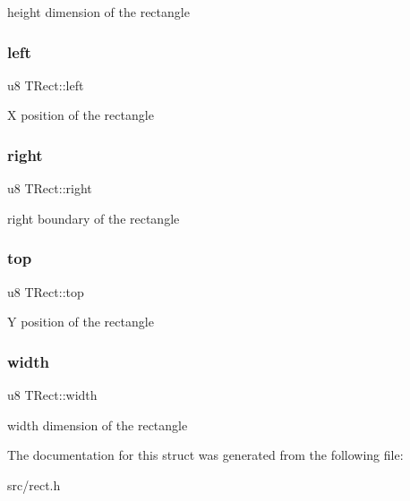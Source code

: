 height dimension of the rectangle \mbox{\label{structTRect_abf4bc428ae2b560efda3c60687a73f00}} 
\subsubsection{\texorpdfstring{left}{left}}
{\footnotesize\ttfamily u8 T\+Rect\+::left}

X position of the rectangle \mbox{\label{structTRect_ae2a5778c81eb1e464703e1a563e7dcf0}} 
\subsubsection{\texorpdfstring{right}{right}}
{\footnotesize\ttfamily u8 T\+Rect\+::right}

right boundary of the rectangle \mbox{\label{structTRect_a145b5ca0d242dc39c33f1fa72dd04056}} 
\subsubsection{\texorpdfstring{top}{top}}
{\footnotesize\ttfamily u8 T\+Rect\+::top}

Y position of the rectangle \mbox{\label{structTRect_a1a0b1f4f8d316782395a16e4b88bc66f}} 
\subsubsection{\texorpdfstring{width}{width}}
{\footnotesize\ttfamily u8 T\+Rect\+::width}

width dimension of the rectangle 

The documentation for this struct was generated from the following file\+:\begin{DoxyCompactItemize}
\item 
src/rect.\+h\end{DoxyCompactItemize}
